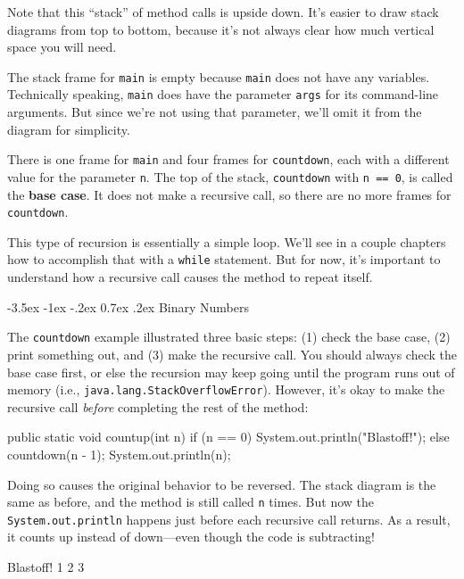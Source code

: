 \documentclass[12pt]{book}
\makeatletter
\renewcommand{\section}{\@startsection {section}{1}{\z@}%
    {-3.5ex \@plus -1ex \@minus -.2ex}%
    {0.7ex \@plus.2ex}%
    {\normalfont\Large\bfseries}}
\theoremstyle{exercise}
\newcommand{\java}[1]{\lstinline{#1}} %
\makeatother
\begin{document}
Note that this ``stack'' of method calls is upside down.
It's easier to draw stack diagrams from top to bottom, because it's not always clear how much vertical space you will need.

The stack frame for \java{main} is empty because \java{main} does not have any variables.
Technically speaking, \java{main} does have the parameter \java{args} for its command-line arguments.
But since we're not using that parameter, we'll omit it from the diagram for simplicity.

There is one frame for \java{main} and four frames for \java{countdown}, each with a different value for the parameter \java{n}.
The top of the stack, \java{countdown} with \java{n == 0}, is called the {\bf base case}.
It does not make a recursive call, so there are no more frames for \java{countdown}.

This type of recursion is essentially a simple loop.
We'll see in a couple chapters how to accomplish that with a \java{while} statement.
But for now, it's important to understand how a recursive call causes the method to repeat itself.


\section{Binary Numbers}

The \java{countdown} example illustrated three basic steps: (1) check the base case, (2) print something out, and (3) make the recursive call.
You should always check the base case first, or else the recursion may keep going until the program runs out of memory (i.e., \java{java.lang.StackOverflowError}).
However, it's okay to make the recursive call {\it before} completing the rest of the method:

\begin{code}
    public static void countup(int n) {
        if (n == 0) {
            System.out.println("Blastoff!");
        } else {
            countdown(n - 1);
            System.out.println(n);
        }
    }
\end{code}

Doing so causes the original behavior to be reversed.
The stack diagram is the same as before, and the method is still called \java{n} times.
But now the \java{System.out.println} happens just before each recursive call returns.
As a result, it counts up instead of down---even though the code is subtracting!

\begin{stdout}
Blastoff!
1
2
3
\end{stdout}
\end{document}
